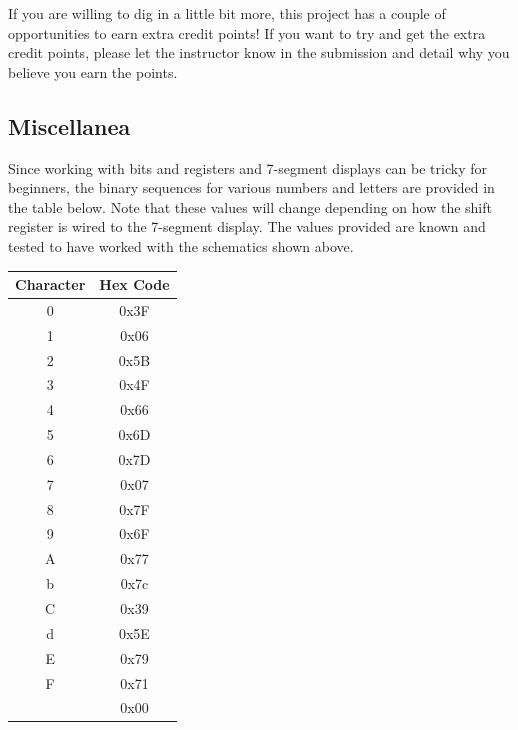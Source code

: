     If you are willing to dig in a little bit more, this project has a couple of opportunities to earn extra credit points!
    If you want to try and get the extra credit points, please let the instructor know in the submission and detail why you believe you earn the points.

    \subsection*{Miscellanea}
    Since working with bits and registers and 7-segment displays can be tricky for beginners, the binary sequences for various numbers and letters are provided in the table below. Note that these values will change depending on how the shift register is wired to the 7-segment display. The values provided are known and tested to have worked with the schematics shown above.

    \begin{margintable}[-1.5in]
        \begin{tabular}{c | c}
            \toprule
            Character & Hex Code \\

            \midrule
            0 & 0x3F \\
            1 & 0x06 \\
            2 & 0x5B \\
            3 & 0x4F \\
            4 & 0x66 \\
            5 & 0x6D \\
            6 & 0x7D \\
            7 & 0x07 \\
            8 & 0x7F \\
            9 & 0x6F \\
            A & 0x77 \\
            b & 0x7c \\
            C & 0x39 \\
            d & 0x5E \\
            E & 0x79 \\
            F & 0x71 \\
              & 0x00 \\

            \bottomrule
        \end{tabular}
    \end{margintable}


